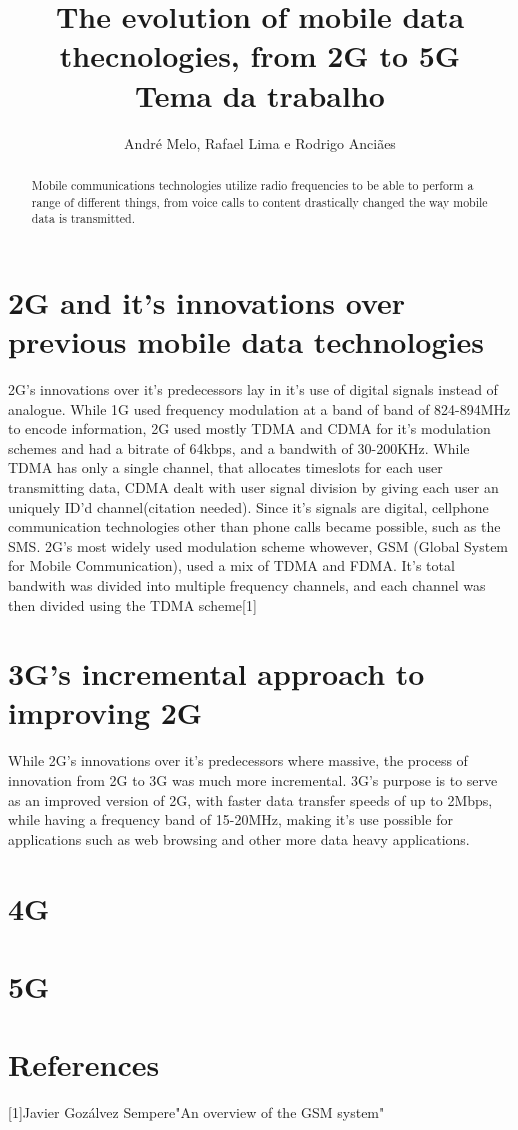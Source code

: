 \documentclass{article}
\title{The evolution of mobile data thecnologies, from 2G to 5G\\
	\large Tema da trabalho \\}
\author{André Melo, Rafael Lima e Rodrigo Anciães}
\begin{document}
\maketitle
\begin{abstract}
Mobile communications technologies utilize radio frequencies to be able to perform a range of different things, from voice calls to content drastically changed the way mobile data is transmitted.
\end{abstract}
\pagebreak

\section{2G and it's innovations over previous mobile data technologies}
2G's innovations over it's predecessors lay in it's use of digital signals instead of analogue. While 1G used frequency modulation at a band of band of 824-894MHz to encode information, 2G used mostly TDMA and CDMA for it's modulation schemes and had a bitrate of 64kbps, and a bandwith of 30-200KHz. While TDMA has only a single channel, that allocates timeslots for each user transmitting data, CDMA dealt with user signal division by giving each user an uniquely ID'd channel(citation needed). Since it's signals are digital, cellphone communication technologies other than phone calls became possible, such as the SMS. 2G's most widely used modulation scheme whowever, GSM (Global System for Mobile Communication), used a mix of TDMA and FDMA. It's total bandwith was divided into multiple frequency channels, and each channel was then divided using the TDMA scheme[1]

\section{3G's incremental approach to improving 2G}
While 2G's innovations over it's predecessors where massive, the process of innovation from 2G to 3G was much more incremental. 3G's purpose is to serve as an improved version of 2G, with faster data transfer speeds of up to 2Mbps, while having a frequency band of 15-20MHz, making it's use possible for applications such as web browsing and other more data heavy applications.

\section{4G}

\section{5G}

\section{References}
[1]Javier Gozálvez Sempere"An overview of the GSM system"
\end{document}
